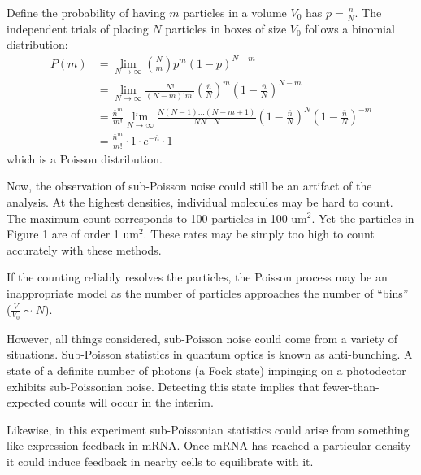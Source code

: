 \documentclass{article}
\begin{document}
    
    Define the probability of having $m$ particles in a volume $V_0$ has $p= \frac{\bar{n}}{N}$. The independent trials of placing $N$ particles in boxes of size $V_0$ follows a binomial distribution: 
    \begin{align*}
        P(m) &=\lim_{N\rightarrow\infty} {N \choose m} p^m (1-p)^{N-m} \\
        &=\lim_{N\rightarrow\infty} \frac{N!}{(N-m)!m!} \left(\frac{\bar{n}}{N}\right)^m (1-\frac{\bar{n}}{N})^{N-m} \\
        &= \frac{\bar{n}^m}{m!} \lim_{N\rightarrow\infty} \frac{N(N-1)...(N-m+1)}{N N...N} 
        (1-\frac{\bar{n}}{N})^{N} 
        (1-\frac{\bar{n}}{N})^{-m} \\
        &= \frac{\bar{n}^m}{m!} \cdot 1 \cdot e^{-\bar{n}}\cdot 1 \
    \end{align*}
    which is a Poisson distribution.
    
    Now, the observation of sub-Poisson noise could still be an artifact of the analysis. At the highest densities, individual molecules may be hard to count. The maximum count corresponds to 100 particles in 100 um$^2$. Yet the particles in Figure 1 are of order 1 um$^2$. These rates may be simply too high to count accurately with these methods. 
    
    If the counting reliably resolves the particles, the Poisson process may be an inappropriate model as the number of particles approaches the number of ``bins'' ($\frac{V}{V_0}\sim N$).
    
    However, all things considered, sub-Poisson noise could come from a variety of situations. Sub-Poisson statistics in quantum optics is known as anti-bunching. A state of a definite number of photons (a Fock state) impinging on a photodector exhibits sub-Poissonian noise. Detecting this state implies that fewer-than-expected counts will occur in the interim. 
    
    Likewise, in this experiment sub-Poissonian statistics could arise from something like expression feedback in mRNA. Once mRNA has reached a particular density it could induce feedback in nearby cells to equilibrate with it.
\end{document}
